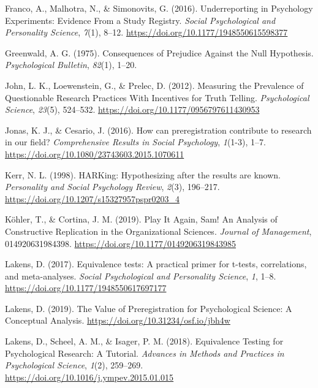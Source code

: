 \documentclass[british,,jou,floatsintext]{apa6}
\begin{document}
\leavevmode\hypertarget{ref-Franco2016}{}%
Franco, A., Malhotra, N., \& Simonovits, G. (2016). Underreporting in Psychology Experiments: Evidence From a Study Registry. \emph{Social Psychological and Personality Science}, \emph{7}(1), 8--12. \url{https://doi.org/10.1177/1948550615598377}

\leavevmode\hypertarget{ref-Greenwald1975}{}%
Greenwald, A. G. (1975). Consequences of Prejudice Against the Null Hypothesis. \emph{Psychological Bulletin}, \emph{82}(1), 1--20.

\leavevmode\hypertarget{ref-John2012}{}%
John, L. K., Loewenstein, G., \& Prelec, D. (2012). Measuring the Prevalence of Questionable Research Practices With Incentives for Truth Telling. \emph{Psychological Science}, \emph{23}(5), 524--532. \url{https://doi.org/10.1177/0956797611430953}

\leavevmode\hypertarget{ref-Jonas2016}{}%
Jonas, K. J., \& Cesario, J. (2016). How can preregistration contribute to research in our field? \emph{Comprehensive Results in Social Psychology}, \emph{1}(1-3), 1--7. \url{https://doi.org/10.1080/23743603.2015.1070611}

\leavevmode\hypertarget{ref-Kerr1998}{}%
Kerr, N. L. (1998). HARKing: Hypothesizing after the results are known. \emph{Personality and Social Psychology Review}, \emph{2}(3), 196--217. \url{https://doi.org/10.1207/s15327957pspr0203_4}

\leavevmode\hypertarget{ref-Kohler2019}{}%
Köhler, T., \& Cortina, J. M. (2019). Play It Again, Sam! An Analysis of Constructive Replication in the Organizational Sciences. \emph{Journal of Management}, 014920631984398. \url{https://doi.org/10.1177/0149206319843985}

\leavevmode\hypertarget{ref-R-TOSTER}{}%
Lakens, D. (2017). Equivalence tests: A practical primer for t-tests, correlations, and meta-analyses. \emph{Social Psychological and Personality Science}, \emph{1}, 1--8. \url{https://doi.org/10.1177/1948550617697177}

\leavevmode\hypertarget{ref-Lakens2019b}{}%
Lakens, D. (2019). The Value of Preregistration for Psychological Science: A Conceptual Analysis. \url{https://doi.org/10.31234/osf.io/jbh4w}

\leavevmode\hypertarget{ref-Lakens2018a}{}%
Lakens, D., Scheel, A. M., \& Isager, P. M. (2018). Equivalence Testing for Psychological Research: A Tutorial. \emph{Advances in Methods and Practices in Psychological Science}, \emph{1}(2), 259--269. \url{https://doi.org/10.1016/j.ympev.2015.01.015}
\end{document}
